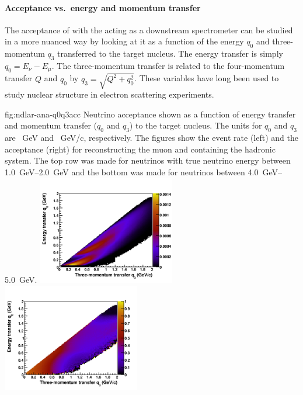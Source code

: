 \paragraph{Acceptance vs.\ energy and momentum transfer}

The acceptance of  with the  acting as a downstream spectrometer can be studied in a more nuanced way by looking at it as a function of the energy $q_0$ and three-momentum $q_3$ transferred to the target nucleus. 
The energy transfer is simply $q_0=E_\nu - E_\mu$. 
The three-momentum transfer is related to the four-momentum transfer $Q$ and $q_0$ by $q_3 = \sqrt{Q^2 + q_0^2}$. 
These variables have long been used to study nuclear structure in electron scattering experiments. 

\begin{dunefigure}{fig:ndlar-ana-q0q3acc}
{Neutrino acceptance shown as a function of energy transfer and momentum transfer ($q_0$ and $q_3$) to the target nucleus. The units for $q_0$ and $q_3$ are \SI{}{\giga\electronvolt} and \SI{}{\giga\electronvolt}/c, respectively. The figures show the event rate (left) and the acceptance (right) for reconstructing the muon and containing the hadronic system. The top row was made for neutrinos with true neutrino energy between \SIrange{1.0}{2.0}{\giga\electronvolt} and the bottom was made for neutrinos between \SIrange{4.0}{5.0}{\giga\electronvolt}.}
      \includegraphics[width=0.45\textwidth]{graphics/lartpc/rate_q0q3_Ev_1000_2000.png}
      \includegraphics[width=0.45\textwidth]{graphics/lartpc/eff_q0q3_Ev_1000_2000.png}

\end{dunefigure}
